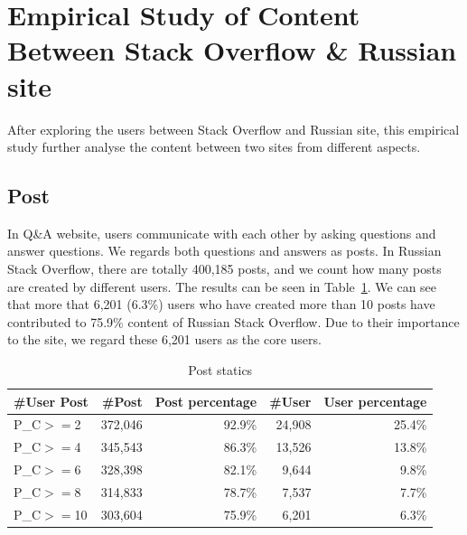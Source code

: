 \section{Empirical Study of Content Between Stack Overflow \& Russian site}

After exploring the users between Stack Overflow and Russian site, this empirical study further analyse the content between two sites from different aspects.

\subsection{Post}
In Q\&A website, users communicate with each other by asking questions and answer questions.
We regards both questions and answers as posts.
In Russian Stack Overflow, there are totally 400,185 posts, and we count how many posts are created by different users.
The results can be seen in Table~\ref{tab:postnumber}.
We can see that more that 6,201 (6.3\%) users who have created more than 10 posts have contributed to 75.9\% content of Russian Stack Overflow.
Due to their importance to the site, we regard these 6,201 users as the core users.

\begin{table}
	\centering
	\caption{Post statics}
	\label{tab:postnumber}
	\begin{tabular}{lrrrr}
		\hline
		\#User Post & \#Post & Post percentage& \#User &User percentage \\
		\hline
		P\_C$>=$2 &372,046&92.9\%&24,908&25.4\%\\
		P\_C$>=$4 &345,543&86.3\%&13,526&13.8\%\\
		P\_C$>=$6 &328,398&82.1\%&9,644&9.8\%\\
		P\_C$>=$8 &314,833&78.7\%&7,537&7.7\%\\
		P\_C$>=$10&303,604&75.9\%&6,201&6.3\%\\
		\hline
	\end{tabular}
\end{table}	

